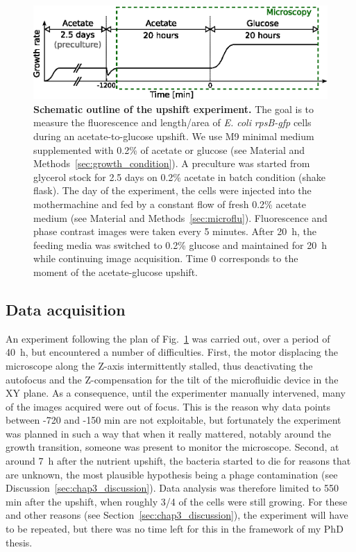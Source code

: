 \begin{figure}[tb]
\centering
\includegraphics[scale=1]{./Fig/experiment_schema.eps}
\caption{
\textbf{Schematic outline of the upshift experiment.}
The goal is to measure the fluorescence and length/area of \textit{E. coli} \textit{rpsB-gfp} cells during an acetate-to-glucose upshift.
We use M9 minimal medium supplemented with 0.2\% of acetate or glucose (see Material and Methods~\ref{sec:growth_condition}).
A preculture was started from glycerol stock for 2.5 days on 0.2\% acetate in batch condition (shake flask).
The day of the experiment, the cells were injected into the mothermachine and fed by a constant flow of fresh 0.2\% acetate medium (see Material and Methods~\ref{sec:microflu}).
Fluorescence and phase contrast images were taken every 5 minutes.
After 20~h, the feeding media was switched to 0.2\% glucose and maintained for 20~h while continuing image acquisition.
Time 0 corresponds to the moment of the acetate-glucose upshift.
}
\label{fig:experiment_schema}
\end{figure}

\subsection{Data acquisition}
\label{sec:data_acquisition}

An experiment following the plan of Fig.~\ref{fig:experiment_schema} was carried out, over a period of 40~h, but encountered a number of difficulties.
First, the motor displacing the microscope along the Z-axis intermittently stalled, thus deactivating the autofocus and the Z-compensation for the tilt of the microfluidic device in the XY plane.
As a consequence, until the experimenter manually intervened, many of the images acquired were out of focus.
This is the reason why data points between -720 and -150 min are not exploitable, but fortunately the experiment was planned in such a way that when it really mattered, notably around the growth transition, someone was present to monitor the microscope.
Second, at around 7~h after the nutrient upshift, the bacteria started to die for reasons that are unknown, the most plausible hypothesis being a phage contamination (see Discussion~\ref{sec:chap3_discussion}).
Data analysis was therefore limited to 550 min after the upshift, when roughly 3/4 of the cells were still growing.
For these and other reasons (see Section~\ref{sec:chap3_discussion}), the experiment will have to be repeated, but there was no time left for this in the framework of my PhD thesis.

